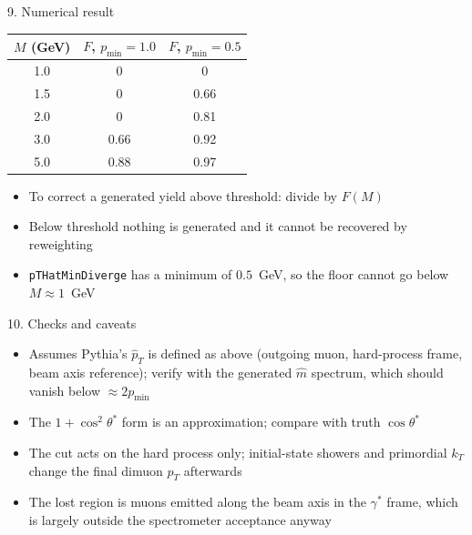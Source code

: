 \documentclass[aspectratio=169]{beamer}
\begin{document}
\begin{frame}{9. Numerical result}
  \begin{center}
  \begin{tabular}{ccc}
    $M$ (GeV) & $F$, $p_{\min}=1.0$ & $F$, $p_{\min}=0.5$\\ \hline
    1.0 & 0    & 0   \\
    1.5 & 0    & 0.66\\
    2.0 & 0    & 0.81\\
    3.0 & 0.66 & 0.92\\
    5.0 & 0.88 & 0.97
  \end{tabular}
  \end{center}
  \begin{itemize}
    \item To correct a generated yield above threshold: divide by $F(M)$
    \item Below threshold nothing is generated and it cannot be recovered by reweighting
    \item \texttt{pTHatMinDiverge} has a minimum of $0.5$~GeV, so the floor cannot go below $M\approx1$~GeV
  \end{itemize}
\end{frame}

\begin{frame}{10. Checks and caveats}
  \begin{itemize}
    \item Assumes Pythia's $\hat p_T$ is defined as above (outgoing muon, hard-process frame,
          beam axis reference); verify with the generated $\hat m$ spectrum, which should
          vanish below $\approx 2p_{\min}$
    \item The $1+\cos^2\theta^*$ form is an approximation; compare with truth $\cos\theta^*$
    \item The cut acts on the hard process only; initial-state showers and primordial $k_T$
          change the final dimuon $p_T$ afterwards
    \item The lost region is muons emitted along the beam axis in the $\gamma^*$ frame,
          which is largely outside the spectrometer acceptance anyway
  \end{itemize}
\end{frame}
\end{document}
